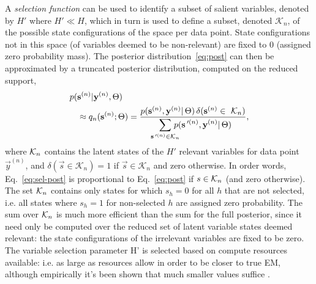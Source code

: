 A \textit{selection function} can be used to identify a  subset
of salient variables, denoted by $H'$ where $H' \ll H$, which in turn is used to define a subset, denoted $\mathcal{K}_n$, of the possible state configurations of the space per data point. 
State configurations not in this space (of variables deemed to be non-relevant) are fixed to $0$ (assigned zero probability mass).
%
The posterior distribution~\eqref{eq:post} can then be approximated by a truncated posterior distribution, computed on the reduced support,
%
\vspace{-.1cm}
\begin{align}
\label{eq:sel-post}
p(&\vec{s}^{(n)}|\vec{y}^{(n)},\Theta) \nonumber\\
&\approx q_n(\vec{s}^{(n)};\Theta) = \frac{p(\vec{s}^{(n)},\vec{y}^{(n)}|\,\Theta) \,\delta(\vec{s}^{(n)}\in\,\,\Kn)}
{\disS\hspace{-1.5mm}\sum_{\vec{s}\Prime^{(n)}\in\mathcal{K}_n}\hspace{-3mm} p(\vec{s}\Prime^{(n)},\vec{y}^{(n)}|\,\Theta)},
\end{align}
\normalsize
%
where $\mathcal{K}_{n}$ contains the latent states of the $H'$ relevant variables for data point
$\vec{y}^{(n)}$, and $\delta(\vec{s}\in\mathcal{K}_n)=1$ if
$\vec{s}\in\mathcal{K}_n$ and zero otherwise.
In order words, Eq.~\eqref{eq:sel-post} is proportional to Eq.~\eqref{eq:post} if $s \in \mathcal{K}_{n}$ (and zero otherwise). 
The set $\mathcal{K}_{n}$ contains only states for which $s_h=0$ for all $h$ that are not selected, i.e. all states where $s_h=1$ for non-selected $h$ are assigned zero probability.
The sum over $\mathcal{K}_{n}$ is much more efficient than the sum for the full posterior, since it need only be computed over the reduced set of latent variable states deemed relevant: the state configurations of the irrelevant variables are fixed to be zero.
The variable selection parameter H' is selected based on compute resources available: i.e. as large as resources allow in order to be closer to true EM, although empirically it's been shown that much smaller values suffice  \citep[see e.g.][App. B on complexity-accuracy trade-offs]{SheikhEtAl2014}.


